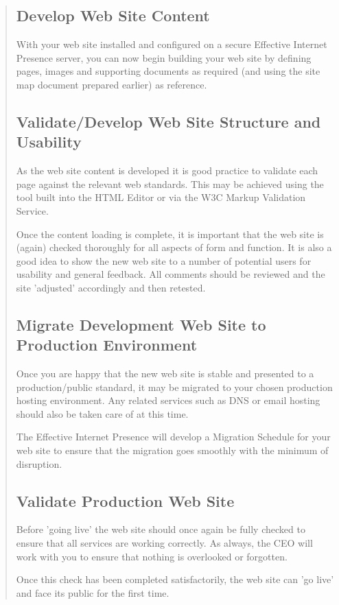 \documentclass[35pt]{report}
\begin{document}
\begin{quote}
			\subsection{Develop Web Site Content}
			With your web site installed and configured on a secure Effective Internet Presence server, you can now begin building your web site by defining pages, images and supporting documents as required (and using the site map document prepared earlier) as reference.

			\subsection{Validate/Develop Web Site Structure and Usability}
			As the web site content is developed it is good practice to validate each page against the relevant web standards. This may be achieved using the tool built into the HTML Editor or via the W3C Markup Validation Service.

			Once the content loading is complete, it is important that the web site is (again) checked thoroughly for all aspects of form and function. It is also a good idea to show the new web site to a number of potential users for usability and general feedback. All comments should be reviewed and the site 'adjusted' accordingly and then retested.

			\subsection{Migrate Development Web Site to Production Environment}
			Once you are happy that the new web site is stable and presented to a production/public standard, it may be migrated to your chosen production hosting environment. Any related services such as DNS or email hosting should also be taken care of at this time.

			The Effective Internet Presence will develop a Migration Schedule for your web site to ensure that the migration goes smoothly with the minimum of disruption.

		 	\subsection{Validate Production Web Site}
			Before 'going live' the web site should once again be fully checked to ensure that all services are working correctly. As always, the CEO will work with you to ensure that nothing is overlooked or forgotten.

			Once this check has been completed satisfactorily, the web site can 'go live' and face its public for the first time.


\end{quote}
\end{document}
